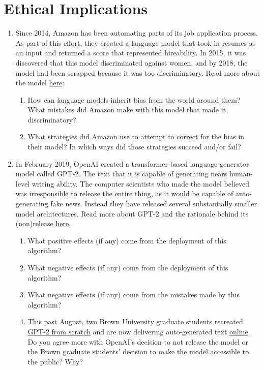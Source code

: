 \documentclass{article}
\begin{document}
\section{Ethical Implications}
\begin{enumerate}

\item 
Since 2014, Amazon has been automating parts of its job application process. As part of this effort, they created a language model that took in resumes as an input and returned a score that represented hireability. In 2015, it was discovered that this model discriminated against women, and by 2018, the model had been scrapped because it was too discriminatory. Read more about the model \href{https://www.reuters.com/article/us-amazon-com-jobs-automation-insight/amazon-scraps-secret-ai-recruiting-tool-that-showed-bias-against-women-idUSKCN1MK08G}{here}:
\begin{enumerate}
\item
How can language models inherit bias from the world around them? What mistakes did Amazon make with this model that made it discriminatory?
\item What strategies did Amazon use to attempt to correct for the bias in their model? In which ways did those strategies succeed and/or fail?

\end{enumerate}

\item
In February 2019, OpenAI created a transformer-based language-generator model called GPT-2. The text that it is capable of generating nears human-level writing ability. The computer scientists who made the model believed was irresponsible to release the entire thing, as it would be capable of auto-generating fake news. Instead they have released several substantially smaller model architectures. Read more about GPT-2 and the rationale behind its (non)release \href{https://openai.com/blog/better-language-models/}{here}.
\begin{enumerate}
    \item 
    What positive effects (if any) come from the deployment of this algorithm?
    \item What negative effects (if any) come from the deployment of this algorithm?
    \item What negative effects (if any) come from the mistakes made by this algorithm?
    \item This past August, two Brown University graduate students \href{https://www.wired.com/story/dangerous-ai-open-source/}{recreated GPT-2 from scratch} and are now delivering auto-generated text \href{https://talktotransformer.com/}{online}. Do you agree more with OpenAI’s decision to not release the model or the Brown graduate students’ decision to make the model accessible to the public? Why?
\end{enumerate}

\end{enumerate}
\end{document}
